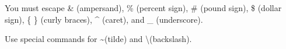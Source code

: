 You must escape \& (ampersand), \% (percent sign),
\# (pound sign), \$ (dollar sign), \{ \} (curly braces),
\^{} (caret), and \_ (underscore).

Use special commands for \textasciitilde (tilde) and 
\textbackslash (backslash).
